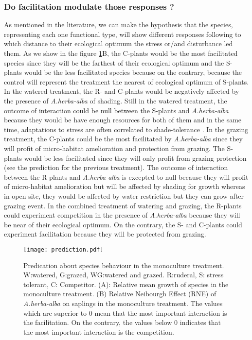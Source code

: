 \documentclass[12pt, a4paper]{article} %
\begin{document}
\subsubsection{Do facilitation modulate those responses ?}
As mentioned in the literature, we can make the hypothesis that the species, representing each one functional type, will show different responses following to which distance to their ecological optimum the stress or/and disturbance led them. As we show in the figure \ref{pred}B, the C-plants would be the most facilitated species since they will be the farthest of their ecological optimum and the S-plants would be the less facilitated species because on the contrary, because the control will represent the treatment the nearest of ecological optimum of S-plants. In the watered treatment, the R- and C-plants would be negatively affected by the presence of \textit{A.herba-alba} of shading. Still in the watered treatment, the outcome of interaction could be null between the S-plants and \textit{A.herba-alba} because they would be have enough resources for both of them and in the same time, adaptations to stress are often correlated to shade-tolerance \citep{Grime1977a}. In the grazing treatment, the C-plants could be the most facilitated by \textit{A.herba-alba} since they will profit of micro-habitat amelioration and protection from grazing. The S-plants would be less facilitated since they will only profit from grazing protection (see the prediction for the previous treatment). The outcome of interaction between the R-plants and \textit{A.herba-alba} is excepted to null because they will profit of micro-habitat amelioration but will be affected by shading for growth whereas in open site, they would be affected by water restriction but they can grow after grazing event. In the combined treatment of watering and grazing, the R-plants could experiment competition in the presence of \textit{A.herba-alba} because they will be near of their ecological optimum. On the contrary, the S- and C-plants could experiment facilitation because they will be protected from grazing.
\begin{figure} %
\begin{center}
\texttt{[image: prediction.pdf]}
\end{center}
\caption{Predication about species behaviour in the monoculture treatment. W:watered, G:grazed, WG:watered and grazed. R:ruderal, S: stress tolerant, C: Competitor. (A): Relative mean growth of species in the monoculture treatment. (B) Relative Neibourgh Effect (RNE) of \textit{A.herba-alba} on saplings in the monoculture treatment. The values which are superior to 0 mean that the most important interaction is the facilitation. On the contrary, the values below 0 indicates that the most important interaction is the competition.\label{pred}}
\end{figure}
\end{document}

